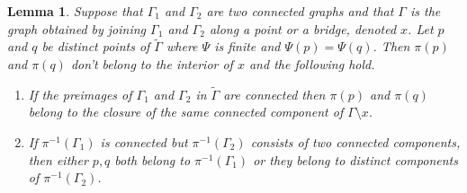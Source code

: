 \documentclass[11pt]{article}
\newtheorem{lemma}[theo]{Lemma}
\theoremstyle{definition}
\numberwithin{equation}{section}
\theoremstyle{definition}
\newcommand{\wt}[1]{\widetilde{#1}}
\begin{document}
\begin{lemma}\label{lem:AbelPrymSeparatesTwoConnectedComponents}
Suppose that $\Gamma_1$ and $\Gamma_2$ are two connected graphs and that $\Gamma$ is the graph obtained by joining $\Gamma_1$ and $\Gamma_2$ along a point or a bridge, denoted $x$. 
Let $p$ and $q$ be distinct points of $\wt\Gamma$ where $\Psi$ is finite and $\Psi(p) = \Psi(q)$. Then $\pi(p)$ and $\pi(q)$ don't belong to the interior of $x$ and the following hold.
\begin{enumerate}
    \item If the preimages of $\Gamma_1$ and $\Gamma_2$ in $\wt\Gamma$ are connected then $\pi(p)$ and $\pi(q)$ belong to the closure of the same connected component of $\Gamma\setminus x$.

    \item If $\pi^{-1}(\Gamma_1)$ is connected but $\pi^{-1}(\Gamma_2)$ consists of two connected components, then either $p,q$ both belong to $\pi^{-1}(\Gamma_1)$ or they belong  to distinct components of $\pi^{-1}(\Gamma_2)$.
\end{enumerate}


\end{lemma}
\end{document}
